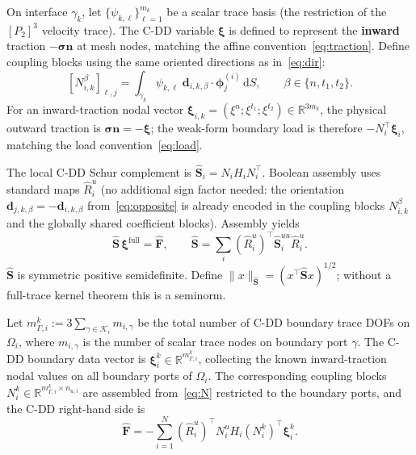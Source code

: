 \documentclass[11pt,a4paper]{article}
\newcommand{\R}{\mathbb{R}}
\newcommand{\pore}[1]{\Omega_{#1}}
\newcommand{\iface}{\gamma}
\newcommand{\stress}{\bm{\sigma}}
\newcommand{\normal}{\bm{n}}
\newcommand{\Schur}{\mathbf{S}}
\begin{document}
On interface $\iface_k$, let $\{\psi_{k,\ell}\}_{\ell=1}^{m_k}$ be a
scalar trace basis (the restriction of the $[P_2]^3$ velocity trace).
The C-DD variable $\bm{\xi}$ is defined to represent the \textbf{inward}
traction $-\stress\normal$ at mesh nodes, matching the affine
convention~\eqref{eq:traction}.
Define coupling blocks using the same oriented directions as
in~\eqref{eq:dir}:
\begin{equation}\label{eq:N}
  [N_{i,k}^{\beta}]_{\ell,j}
  = \int_{\iface_k} \psi_{k,\ell}\;
    \bm{d}_{i,k,\beta}\cdot\bm{\phi}_j^{(i)}\,\mathrm{d}S,
  \qquad \beta \in \{n,t_1,t_2\}.
\end{equation}
For an inward-traction nodal vector $\bm{\xi}_{i,k}
= (\xi^n;\xi^{t_1};\xi^{t_2}) \in \R^{3m_k}$, the physical outward
traction is $\stress\normal = -\bm{\xi}$; the weak-form boundary load
is therefore $-N_i^\top \bm{\xi}_i$, matching the load
convention~\eqref{eq:load}.

The local C-DD Schur complement is
$\widehat{\Schur}_i = N_i H_i N_i^\top$.
Boolean assembly uses standard maps $\widehat{R}_i^u$ (no additional
sign factor needed: the orientation $\bm{d}_{j,k,\beta}
= -\bm{d}_{i,k,\beta}$ from~\eqref{eq:opposite} is already encoded in
the coupling blocks $N_{i,k}^\beta$ and the globally shared coefficient
blocks).  Assembly yields
\begin{equation}\label{eq:cdd}
  \widehat{\Schur}\,\bm{\xi}^{\text{full}} = \widehat{\bm{F}},\qquad
  \widehat{\Schur} = \sum_i (\widehat{R}_i^u)^\top
    \widehat{\Schur}_i^{uu} \widehat{R}_i^u.
\end{equation}
$\widehat{\Schur}$ is symmetric positive semidefinite.
Define $\|x\|_{\widehat{\Schur}} = (x^\top\widehat{\Schur} x)^{1/2}$;
without a full-trace kernel theorem this is a seminorm.

Let $m_{\Gamma,i}^k := 3\sum_{\gamma\in\mathcal{K}_i} m_{i,\gamma}$
be the total number of C-DD boundary trace DOFs on $\pore{i}$,
where $m_{i,\gamma}$ is the number of scalar trace nodes on boundary
port $\gamma$.  The C-DD boundary data vector is
$\bm{\xi}_i^k \in \R^{m_{\Gamma,i}^k}$, collecting the known
inward-traction nodal values on all boundary ports of $\pore{i}$.
The corresponding coupling blocks $N_i^k \in \R^{m_{\Gamma,i}^k
\times n_{u,i}}$ are assembled from~\eqref{eq:N} restricted to
the boundary ports, and the C-DD right-hand side is
\begin{equation}\label{eq:cdd-F}
  \widehat{\bm{F}}
  = -\sum_{i=1}^N (\widehat{R}_i^u)^\top
    N_i^u H_i (N_i^k)^\top \bm{\xi}_i^k.
\end{equation}
\end{document}
